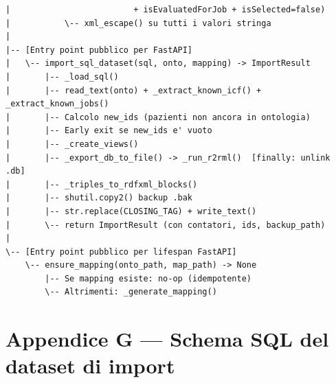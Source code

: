 \documentclass[a4paper,12pt]{article}
\begin{document}
\begin{lstlisting}[caption={Pseudo-outline di \texttt{importer.py}.}, numbers=none]
|                         + isEvaluatedForJob + isSelected=false)
|           \-- xml_escape() su tutti i valori stringa
|
|-- [Entry point pubblico per FastAPI]
|   \-- import_sql_dataset(sql, onto, mapping) -> ImportResult
|       |-- _load_sql()
|       |-- read_text(onto) + _extract_known_icf() + _extract_known_jobs()
|       |-- Calcolo new_ids (pazienti non ancora in ontologia)
|       |-- Early exit se new_ids e' vuoto
|       |-- _create_views()
|       |-- _export_db_to_file() -> _run_r2rml()  [finally: unlink .db]
|       |-- _triples_to_rdfxml_blocks()
|       |-- shutil.copy2() backup .bak
|       |-- str.replace(CLOSING_TAG) + write_text()
|       \-- return ImportResult (con contatori, ids, backup_path)
|
\-- [Entry point pubblico per lifespan FastAPI]
    \-- ensure_mapping(onto_path, map_path) -> None
        |-- Se mapping esiste: no-op (idempotente)
        \-- Altrimenti: _generate_mapping()
\end{lstlisting}

\section*{Appendice G --- Schema SQL del dataset di import}
\end{document}
